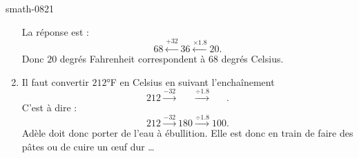 \begin{corrige}{smath-0821}
\begin{enumerate}
\begin{equation}
            \end{equation}
            La réponse est :
            \begin{equation}
                \boxed{68}\stackrel{+32}{\longleftarrow}\boxed{36}\stackrel{\times 1.8}{\longleftarrow}\boxed{20}.
            \end{equation}
            Donc \( 20\) degrés Fahrenheit correspondent à \( 68\) degrés Celsius.
        \item
            Il faut convertir \( 212\)°F en Celsius en suivant l'enchaînement
            \begin{equation}
                \boxed{212}\stackrel{-32}{\longrightarrow}\boxed{\phantom{301}}\stackrel{\div 1.8}{\longrightarrow}\boxed{ \phantom{301} }.
            \end{equation}
            C'est à dire :
            \begin{equation}
                \boxed{212}\stackrel{-32}{\longrightarrow}\boxed{180}\stackrel{\div 1.8}{\longrightarrow}\boxed{100}.
            \end{equation}
            Adèle doit donc porter de l'eau à ébullition. Elle est donc en train de faire des pâtes ou de cuire un œuf dur \ldots
    \end{enumerate}

\end{corrige}
